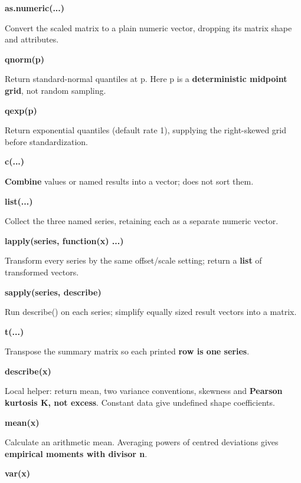 \documentclass[11pt,a4paper]{article}
\begin{document}
\par\noindent\textbf{as.numeric(...)}

Convert the scaled matrix to a plain numeric vector, dropping its matrix shape and attributes.

\par\noindent\textbf{qnorm(p)}

Return standard-normal quantiles at p. Here p is a \textbf{deterministic midpoint grid}, not random sampling.

\par\noindent\textbf{qexp(p)}

Return exponential quantiles (default rate 1), supplying the right-skewed grid before standardization.

\par\noindent\textbf{c(...)}

\textbf{Combine} values or named results into a vector; does not sort them.

\par\noindent\textbf{list(...)}

Collect the three named series, retaining each as a separate numeric vector.

\par\noindent\textbf{lapply(series, function(x) ...)}

Transform every series by the same offset/scale setting; return a \textbf{list} of transformed vectors.

\par\noindent\textbf{sapply(series, describe)}

Run describe() on each series; simplify equally sized result vectors into a matrix.

\par\noindent\textbf{t(...)}

Transpose the summary matrix so each printed \textbf{row is one series}.

\par\noindent\textbf{describe(x)}

Local helper: return mean, two variance conventions, skewness and \textbf{Pearson kurtosis K, not excess}. Constant data give undefined shape coefficients.

\par\noindent\textbf{mean(x)}

Calculate an arithmetic mean. Averaging powers of centred deviations gives \textbf{empirical moments with divisor n}.

\par\noindent\textbf{var(x)}
\end{document}
